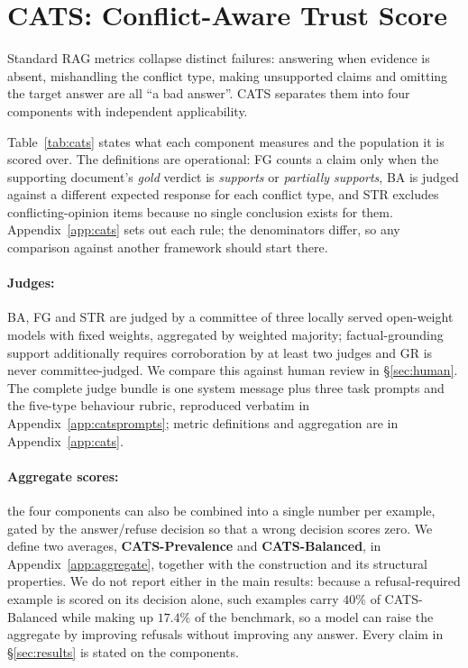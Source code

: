 \section{CATS: Conflict-Aware Trust Score}
\label{sec:cats}

Standard RAG metrics collapse distinct failures: answering when evidence is
absent, mishandling the conflict type, making unsupported claims and omitting
the target answer are all ``a bad answer''. CATS separates them into four
components with independent applicability.



Table~\ref{tab:cats} states what each component measures and the population it is
scored over. The definitions are operational: FG counts a claim only when the
supporting document's \emph{gold} verdict is \textit{supports} or \textit{partially
supports}, BA is judged against a different expected response for each conflict
type, and STR excludes conflicting-opinion items because no single conclusion
exists for them. Appendix~\ref{app:cats} sets out each rule; the denominators
differ, so any comparison against another framework should start there.

\paragraph{Judges:} BA, FG and STR are judged by a committee of three locally
served open-weight models with fixed weights, aggregated by weighted majority;
factual-grounding support additionally requires corroboration by at least two
judges and GR is never committee-judged. We compare this against human review in
\S\ref{sec:human}. The complete judge
bundle is one system message plus three task prompts and the five-type behaviour
rubric, reproduced verbatim in Appendix~\ref{app:catsprompts}; metric definitions
and aggregation are in Appendix~\ref{app:cats}.

\paragraph{Aggregate scores:} the four components can also be combined into a
single number per example, gated by the answer/refuse decision so that a wrong
decision scores zero. We define two averages, \textbf{CATS-Prevalence} and
\textbf{CATS-Balanced}, in Appendix~\ref{app:aggregate}, together with the
construction and its structural properties. We do not report either in the main
results: because a refusal-required example is scored on its decision alone,
such examples carry $40\%$ of CATS-Balanced while making up $17.4\%$ of the
benchmark, so a model can raise the aggregate by improving refusals without
improving any answer. Every claim in \S\ref{sec:results} is stated on the
components.

